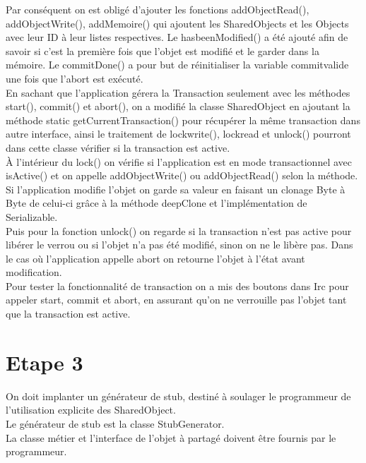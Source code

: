 \documentclass[a4paper,12pt]{article}
\begin{document}
Par conséquent on est obligé d'ajouter les fonctions addObjectRead(), addObjectWrite(), addMemoire() qui ajoutent les SharedObjects et les Objects avec leur ID à leur listes respectives. Le hasbeenModified() a été ajouté afin de savoir si c’est la première fois que l’objet est modifié et le garder dans la mémoire. Le commitDone() a pour but de réinitialiser la variable commitvalide une fois que l’abort est exécuté. \\

En sachant que l’application gérera la Transaction seulement avec les méthodes start(), commit() et abort(), on a modifié la classe SharedObject en ajoutant la méthode static getCurrentTransaction() pour récupérer la même transaction dans autre interface, ainsi le traitement de lockwrite(), lockread et unlock() pourront dans cette classe vérifier si la transaction est active.\\

À l’intérieur du lock() on vérifie si l’application est en mode transactionnel avec isActive() et  on appelle addObjectWrite() ou addObjectRead() selon la méthode. Si l’application modifie l’objet on garde sa valeur en faisant un clonage Byte à Byte de celui-ci grâce à la méthode deepClone et l’implémentation de Serializable. \\

Puis pour la fonction unlock() on regarde si la transaction n’est pas active pour libérer le verrou ou si l’objet n’a pas été modifié, sinon on ne le libère pas. Dans le cas où l’application appelle abort on retourne l’objet à l’état avant modification.\\

Pour tester la fonctionnalité de transaction on a mis des boutons dans Irc pour appeler start, commit et abort, en assurant qu’on ne verrouille pas l’objet tant que la transaction est active. 

\clearpage
\section{Etape 3}

\bigskip
\bigskip

On doit  implanter un générateur de stub, destiné à soulager le programmeur de l'utilisation explicite des SharedObject. \\

Le générateur de stub est la classe StubGenerator.\\
La classe métier et l'interface de l'objet à partagé doivent être fournis par le programmeur.\\
\end{document}
